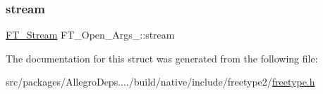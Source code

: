 \mbox{\label{struct_f_t___open___args___ae1e6444bf0c21b323ce6cbe8bc475b2b}} 
\subsubsection{\texorpdfstring{stream}{stream}}
{\footnotesize\ttfamily \hyperlink{ftsystem_8h_a788b32c932932f7411a8dfa7f6c794bf}{F\+T\+\_\+\+Stream} F\+T\+\_\+\+Open\+\_\+\+Args\+\_\+\+::stream}



The documentation for this struct was generated from the following file\+:\begin{DoxyCompactItemize}
\item 
src/packages/\+Allegro\+Deps..../build/native/include/freetype2/\hyperlink{freetype_8h}{freetype.\+h}\end{DoxyCompactItemize}
